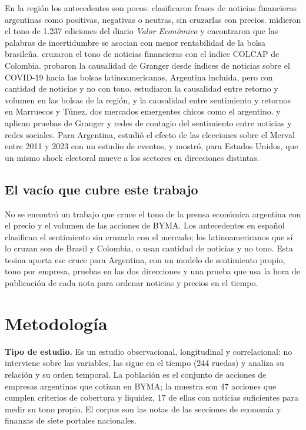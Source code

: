 En la región los antecedentes son pocos. \citet{brana2016} clasificaron frases de noticias
financieras argentinas como positivas, negativas o neutras, sin cruzarlas con precios.
\citet{galdi2018} midieron el tono de 1.237 ediciones del diario \textit{Valor Econômico} y
encontraron que las palabras de incertidumbre se asocian con menor rentabilidad de la bolsa
brasileña. \citet{cruzmontana2025} cruzaron el tono de noticias financieras con el índice
COLCAP de Colombia. \citet{coronado2022,coronado2023} probaron la causalidad de Granger
desde índices de noticias sobre el COVID-19 hacia las bolsas latinoamericanas, Argentina
incluida, pero con cantidad de noticias y no con tono. \citet{rojas2015} estudiaron la
causalidad entre retorno y volumen en las bolsas de la región, y \citet{chniguir2022} la
causalidad entre sentimiento y retornos en Marruecos y Túnez, dos mercados emergentes chicos
como el argentino. \citet{mukherjee2025} y \citet{wu2026} aplican pruebas de Granger y redes
de contagio del sentimiento entre noticias y redes sociales. Para Argentina,
\citet{calandroni2026} estudió el efecto de las elecciones sobre el Merval entre 2011 y 2023
con un estudio de eventos, y \citet{amburgey2025} mostró, para Estados Unidos, que un mismo
shock electoral mueve a los sectores en direcciones distintas.

\subsection{El vacío que cubre este trabajo}

No se encontró un trabajo que cruce el tono de la prensa económica argentina con el precio y
el volumen de las acciones de BYMA. Los antecedentes en español clasifican el sentimiento sin
cruzarlo con el mercado; los latinoamericanos que sí lo cruzan son de Brasil y Colombia, o
usan cantidad de noticias y no tono. Esta tesina aporta ese cruce para Argentina, con un
modelo de sentimiento propio, tono por empresa, pruebas en las dos direcciones y una prueba
que usa la hora de publicación de cada nota para ordenar noticias y precios en el tiempo.

\section{Metodología}
\label{sec:metodologia}

\textbf{Tipo de estudio.} Es un estudio observacional, longitudinal y correlacional: no
interviene sobre las variables, las sigue en el tiempo (244 ruedas) y analiza su relación y su
orden temporal. La población es el conjunto de acciones de empresas argentinas que cotizan en
BYMA; la muestra son 47 acciones que cumplen criterios de cobertura y liquidez, 17 de ellas
con noticias suficientes para medir su tono propio. El corpus son las notas de las secciones
de economía y finanzas de siete portales nacionales.

